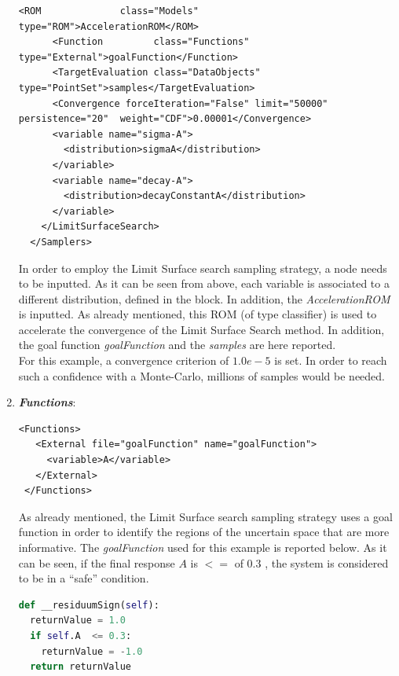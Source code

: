 \begin{enumerate}
\begin{lstlisting}[style=XML,morekeywords={arg,extension,pauseAtEnd,overwrite}]
      <ROM              class="Models"      type="ROM">AccelerationROM</ROM>
      <Function         class="Functions"   type="External">goalFunction</Function>
      <TargetEvaluation class="DataObjects" type="PointSet">samples</TargetEvaluation>
      <Convergence forceIteration="False" limit="50000" persistence="20"  weight="CDF">0.00001</Convergence>
      <variable name="sigma-A">
        <distribution>sigmaA</distribution>
      </variable>
      <variable name="decay-A">
        <distribution>decayConstantA</distribution>
      </variable>
    </LimitSurfaceSearch>
  </Samplers>
\end{lstlisting}
  In order to employ the Limit Surface search sampling strategy, a 
   node needs to be inputted. 
  As it can be
  seen from above, each variable is associated to a different distribution,
  defined in the   block.
  In addition, the \textit{AccelerationROM}   is inputted.
  As already mentioned, this ROM (of type classifier) is used to 
  accelerate the convergence of the Limit Surface Search method.
  In addition, the goal function \textit{goalFunction}  and the 
  \textit{samples} are here reported.
  \\For this example, a convergence criterion of $1.0e-5$ is set. In 
  order to reach such a confidence with a Monte-Carlo, millions of 
  samples would be needed.
   \item \textbf{\textit{Functions}}:
\begin{lstlisting}[style=XML,morekeywords={arg,extension,pauseAtEnd,overwrite}]
 <Functions>
   <External file="goalFunction" name="goalFunction">
     <variable>A</variable>
   </External>
 </Functions>
\end{lstlisting}
 As already mentioned, the Limit Surface search sampling strategy uses
 a goal function in order to identify the regions of the uncertain space 
 that are more informative. The \textit{goalFunction} used for this 
 example is reported below. As it can be seen, if the final response $A$ 
 is $<=$ of $0.3$ , the system is considered to be in a ``safe'' condition.
\begin{lstlisting}[language=python]
def __residuumSign(self):
  returnValue = 1.0
  if self.A  <= 0.3:
    returnValue = -1.0
  return returnValue
\end{lstlisting}


\end{enumerate}
